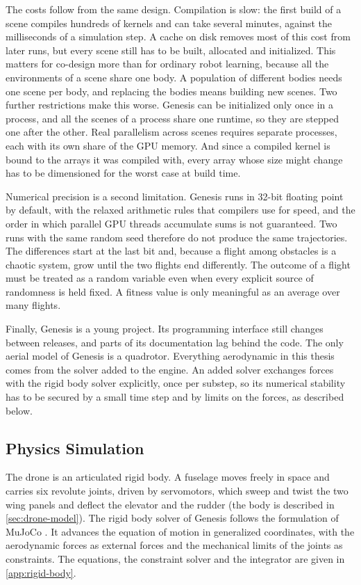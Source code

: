 The costs follow from the same design. Compilation is slow: the first build of a scene compiles hundreds of kernels and can take several minutes, against the milliseconds of a simulation step. A cache on disk removes most of this cost from later runs, but every scene still has to be built, allocated and initialized. This matters for co-design more than for ordinary robot learning, because all the environments of a scene share one body. A population of different bodies needs one scene per body, and replacing the bodies means building new scenes. Two further restrictions make this worse. Genesis can be initialized only once in a process, and all the scenes of a process share one runtime, so they are stepped one after the other. Real parallelism across scenes requires separate processes, each with its own share of the GPU memory. And since a compiled kernel is bound to the arrays it was compiled with, every array whose size might change has to be dimensioned for the worst case at build time.

Numerical precision is a second limitation. Genesis runs in 32-bit floating point by default, with the relaxed arithmetic rules that compilers use for speed, and the order in which parallel GPU threads accumulate sums is not guaranteed. Two runs with the same random seed therefore do not produce the same trajectories. The differences start at the last bit and, because a flight among obstacles is a chaotic system, grow until the two flights end differently. The outcome of a flight must be treated as a random variable even when every explicit source of randomness is held fixed. A fitness value is only meaningful as an average over many flights.

Finally, Genesis is a young project. Its programming interface still changes between releases, and parts of its documentation lag behind the code. The only aerial model of Genesis is a quadrotor. Everything aerodynamic in this thesis comes from the solver added to the engine. An added solver exchanges forces with the rigid body solver explicitly, once per substep, so its numerical stability has to be secured by a small time step and by limits on the forces, as described below.

\subsection{Physics Simulation}
\label{subsec:genesis-physics}

The drone is an articulated rigid body. A fuselage moves freely in space and carries six revolute joints, driven by servomotors, which sweep and twist the two wing panels and deflect the elevator and the rudder (the body is described in \autoref{sec:drone-model}). The rigid body solver of Genesis follows the formulation of MuJoCo \cite{todorov2012mujoco}. It advances the equation of motion in generalized coordinates, with the aerodynamic forces as external forces and the mechanical limits of the joints as constraints. The equations, the constraint solver and the integrator are given in \autoref{app:rigid-body}.

